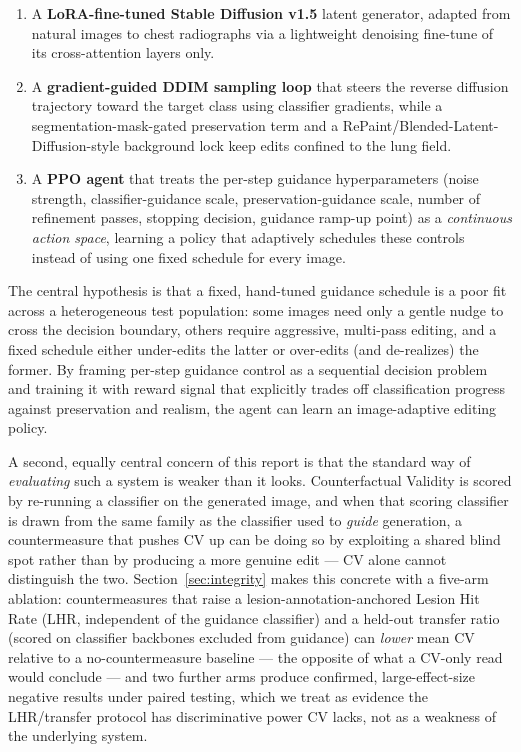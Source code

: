 \documentclass[11pt]{article}
\begin{document}
\begin{enumerate}[leftmargin=*]
  \item A \textbf{LoRA-fine-tuned Stable Diffusion v1.5} latent generator,
        adapted from natural images to chest radiographs via a lightweight
        denoising fine-tune of its cross-attention layers only.
  \item A \textbf{gradient-guided DDIM sampling loop} that steers the
        reverse diffusion trajectory toward the target class using
        classifier gradients, while a segmentation-mask-gated preservation
        term and a RePaint/Blended-Latent-Diffusion-style background lock
        keep edits confined to the lung field.
  \item A \textbf{PPO agent} that treats the per-step guidance
        hyperparameters (noise strength, classifier-guidance scale,
        preservation-guidance scale, number of refinement passes, stopping
        decision, guidance ramp-up point) as a \emph{continuous action
        space}, learning a policy that adaptively schedules these controls
        instead of using one fixed schedule for every image.
\end{enumerate}

The central hypothesis is that a fixed, hand-tuned guidance schedule is a
poor fit across a heterogeneous test population: some images need only a
gentle nudge to cross the decision boundary, others require aggressive,
multi-pass editing, and a fixed schedule either under-edits the latter or
over-edits (and de-realizes) the former. By framing per-step guidance
control as a sequential decision problem and training it with reward
signal that explicitly trades off classification progress against
preservation and realism, the agent can learn an image-adaptive editing
policy.

A second, equally central concern of this report is that the standard way
of \emph{evaluating} such a system is weaker than it looks. Counterfactual
Validity is scored by re-running a classifier on the generated image, and
when that scoring classifier is drawn from the same family as the
classifier used to \emph{guide} generation, a countermeasure that pushes
CV up can be doing so by exploiting a shared blind spot rather than by
producing a more genuine edit — CV alone cannot distinguish the two.
Section~\ref{sec:integrity} makes this concrete with a five-arm ablation:
countermeasures that raise a lesion-annotation-anchored Lesion Hit Rate
(LHR, independent of the guidance classifier) and a held-out transfer
ratio (scored on classifier backbones excluded from guidance) can
\emph{lower} mean CV relative to a no-countermeasure baseline — the
opposite of what a CV-only read would conclude — and two further arms
produce confirmed, large-effect-size negative results under paired
testing, which we treat as evidence the LHR/transfer protocol has
discriminative power CV lacks, not as a weakness of the underlying
system.
\end{document}
